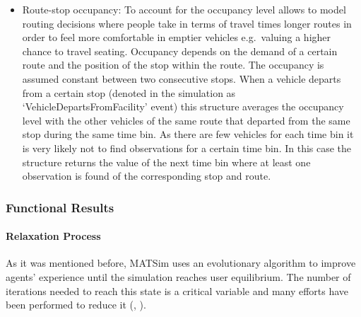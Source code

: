 \begin{itemize}
\item Route-stop occupancy: To account for the occupancy level allows to model routing decisions where people take in terms of travel times longer routes in order to feel more comfortable in emptier vehicles e.g.\ valuing a higher chance to travel seating. Occupancy depends on the demand of a certain route and the position of the stop within the route. The occupancy is assumed constant between two consecutive stops. When a vehicle departs from a certain stop (denoted in the simulation as `VehicleDepartsFromFacility' event) this structure averages the occupancy level with the other vehicles of the same route that departed from the same stop during the same time bin. As there are few vehicles for each time bin it is very likely not to find observations for a certain time bin. In this case the structure returns the value of the next time bin where at least one observation is found of the corresponding stop and route.
\end{itemize}

\subsubsection{Functional Results}
\paragraph{Relaxation Process}

As it was mentioned before, MATSim uses an evolutionary algorithm to improve agents' experience until the simulation reaches user equilibrium. The number of iterations needed to reach this state is a critical variable and many efforts have been performed to reduce it (\citep{MeisterEtAl_STRC_2006}, \citep{FourieEtAl_TRB_2013}).

